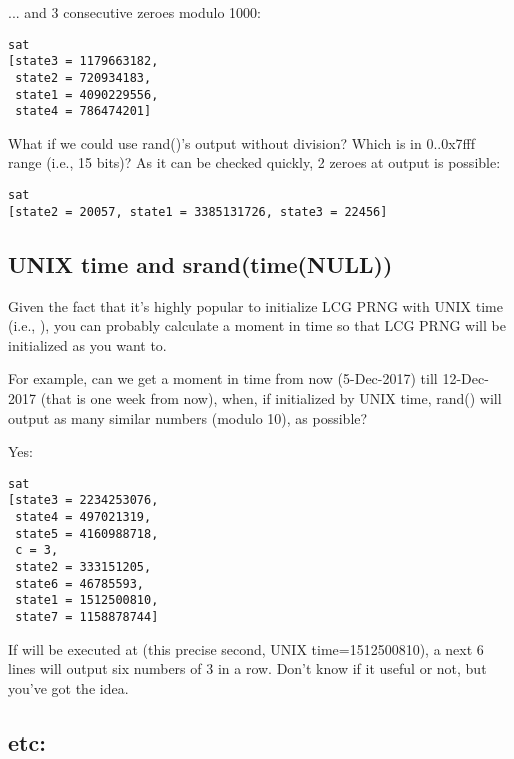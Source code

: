 ... and 3 consecutive zeroes modulo 1000:



\begin{lstlisting}
sat
[state3 = 1179663182,
 state2 = 720934183,
 state1 = 4090229556,
 state4 = 786474201]
\end{lstlisting}

What if we could use rand()'s output without division? Which is in 0..0x7fff range (i.e., 15 bits)?
As it can be checked quickly, 2 zeroes at output is possible:



\begin{lstlisting}
sat
[state2 = 20057, state1 = 3385131726, state3 = 22456]
\end{lstlisting}

\subsection{UNIX time and srand(time(NULL))}

Given the fact that it's highly popular to initialize LCG PRNG with UNIX time (i.e., ), you can probably calculate a moment in time so that LCG PRNG will be initialized as you want to.

For example, can we get a moment in time from now (5-Dec-2017) till 12-Dec-2017 (that is one week from now), when, if initialized by UNIX time, rand() will output as many similar numbers (modulo 10), as possible?



Yes:

\begin{lstlisting}
sat
[state3 = 2234253076,
 state4 = 497021319,
 state5 = 4160988718,
 c = 3,
 state2 = 333151205,
 state6 = 46785593,
 state1 = 1512500810,
 state7 = 1158878744]
\end{lstlisting}

If  will be executed at  (this precise second, UNIX time=1512500810),
a next 6  lines will output six numbers of 3 in a row.
Don't know if it useful or not, but you've got the idea.

\subsection{etc:}

